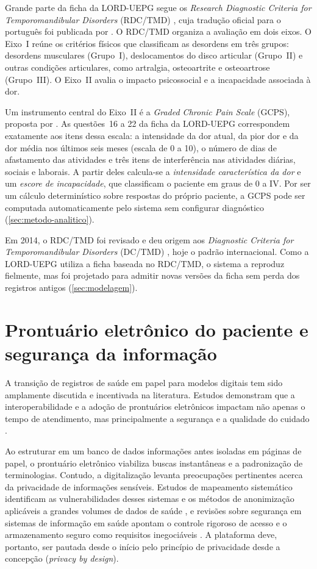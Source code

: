 Grande parte da ficha da LORD-UEPG segue os \textit{Research Diagnostic Criteria for Temporomandibular Disorders} (RDC/TMD) \cite{dworkin1992}, cuja tradução oficial para o português foi publicada por . O RDC/TMD organiza a avaliação em dois eixos. O Eixo~I reúne os critérios físicos que classificam as desordens em três grupos: desordens musculares (Grupo~I), deslocamentos do disco articular (Grupo~II) e outras condições articulares, como artralgia, osteoartrite e osteoartrose (Grupo~III). O Eixo~II avalia o impacto psicossocial e a incapacidade associada à dor.

Um instrumento central do Eixo~II é a \textit{Graded Chronic Pain Scale} (GCPS), proposta por . As questões~16 a 22 da ficha da LORD-UEPG correspondem exatamente aos itens dessa escala: a intensidade da dor atual, da pior dor e da dor média nos últimos seis meses (escala de 0 a 10), o número de dias de afastamento das atividades e três itens de interferência nas atividades diárias, sociais e laborais. A partir deles calcula-se a \emph{intensidade característica da dor} e um \emph{escore de incapacidade}, que classificam o paciente em graus de 0 a IV. Por ser um cálculo determinístico sobre respostas do próprio paciente, a GCPS pode ser computada automaticamente pelo sistema sem configurar diagnóstico (\autoref{sec:metodo-analitico}).

Em 2014, o RDC/TMD foi revisado e deu origem aos \textit{Diagnostic Criteria for Temporomandibular Disorders} (DC/TMD) \cite{schiffman2014}, hoje o padrão internacional. Como a LORD-UEPG utiliza a ficha baseada no RDC/TMD, o sistema a reproduz fielmente, mas foi projetado para admitir novas versões da ficha sem perda dos registros antigos (\autoref{sec:modelagem}).

\section{Prontuário eletrônico do paciente e segurança da informação}
\label{sec:pep}

A transição de registros de saúde em papel para modelos digitais tem sido amplamente discutida e incentivada na literatura. Estudos demonstram que a interoperabilidade e a adoção de prontuários eletrônicos impactam não apenas o tempo de atendimento, mas principalmente a segurança e a qualidade do cuidado \cite{li2022}.

Ao estruturar em um banco de dados informações antes isoladas em páginas de papel, o prontuário eletrônico viabiliza buscas instantâneas e a padronização de terminologias. Contudo, a digitalização levanta preocupações pertinentes acerca da privacidade de informações sensíveis. Estudos de mapeamento sistemático identificam as vulnerabilidades desses sistemas e os métodos de anonimização aplicáveis a grandes volumes de dados de saúde \cite{tertulino2023,zuo2021}, e revisões sobre segurança em sistemas de informação em saúde apontam o controle rigoroso de acesso e o armazenamento seguro como requisitos inegociáveis \cite{shojaei2024}. A plataforma deve, portanto, ser pautada desde o início pelo princípio de privacidade desde a concepção (\textit{privacy by design}).

